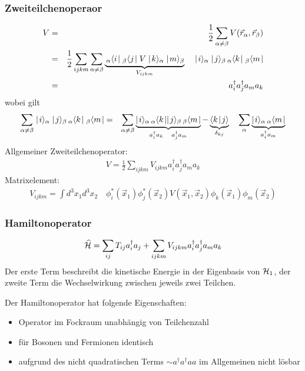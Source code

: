\subsubsection{Zweiteilchenoperaor}
\begin{eqnarray*}
V &=& \frac 1 2 \sum_{\alpha\neq \beta} V (\vec r_\alpha, \vec r_\beta)
\\
&=& \frac 1 2 \sum_{ijkm}\sum_{\alpha \neq \beta} \underbrace{\,_{\alpha}\bra{i}\!\,_{\beta}\bra{j}V\ket{k}_{\alpha}\ket{m}_{\beta}}_{V_{ijkm}} \quad \ket{i}_{\alpha}\ket{j}_{\beta}\,_{\alpha}\bra{k}\!\,_{\beta}\bra{m}
\\
&=& a_i^\dagger a_j^\dagger a_m a_k\\
\end{eqnarray*}
wobei gilt
\begin{eqnarray*}
\sum_{\alpha\neq \beta} \ket{i}_{\alpha}\ket{j}_{\beta}\,_{\alpha}\bra{k}\!\,_{\beta}\bra{m} &=&
\sum_{\alpha \neq \beta} \underbrace{\ket{i}_{\alpha}\,_{\alpha}\bra{k}\ket{j}_{\beta}\,_{\beta}\bra{m}}_{a_i^\dagger a_k \quad a_j^\dagger a_m} - \underbrace{\braket{k}{j}}_{\delta_{kj}}\quad \sum_{\alpha} \underbrace{\ket{i}_{\alpha}\,_{\alpha}\bra{m}}_{a_i^\dagger a_m}
\end{eqnarray*}
Allgemeiner Zweiteilchenoperator:
\begin{eqnarray*} \boxed{ V = \frac 1 2 \sum \limits_{ijkm} V_{ijkm} a_i^\dagger a_j^\dagger a_m a_k}\end{eqnarray*}
Matrixelement:
\begin{eqnarray*} V_{ijkm} = \int d^3 x_1 d^3x_2\quad \phi_i^* (\vec x_1) \phi^* _j(\vec x_2) V(\vec x_1,\vec x_2) \phi_k(\vec x_1)\phi_m(\vec x_2)
\end{eqnarray*}


\subsubsection{Hamiltonoperator}
\begin{eqnarray*}
\widehat {\mathcal H} = \sum_{ij} T_{ij} a_i^\dagger a_j + \sum \limits_{ijkm} V_{ijkm} a_i^\dagger a_j^\dagger a_m a_k
\end{eqnarray*}
Der erste Term beschreibt die kinetische Energie in der Eigenbasis von $\mathcal H_1$, der zweite Term die Wechselwirkung zwischen jeweils zwei Teilchen. 

Der Hamiltonoperator hat folgende Eigenschaften: 
\begin{itemize}
\item Operator im Fockraum unabhängig von Teilchenzahl
\item für Bosonen und Fermionen identisch
\item aufgrund des nicht quadratischen Terms $\sim a^\dagger a^\dagger a a$ im Allgemeinen nicht lösbar
\end{itemize}
